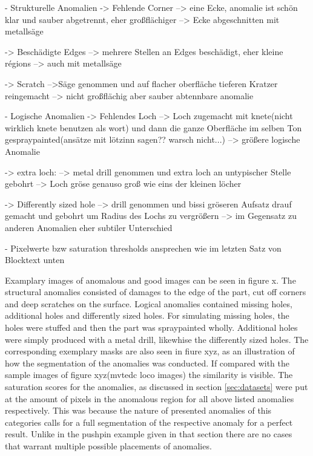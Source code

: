 - Strukturelle Anomalien
-> Fehlende Corner
--> eine Ecke, anomalie ist schön klar und sauber abgetrennt, eher großflächiger
--> Ecke abgeschnitten mit metallsäge

-> Beschädigte Edges 
--> mehrere Stellen an Edges beschädigt, eher kleine régions
--> auch mit metallsäge 

-> Scratch
-->Säge genommen und auf flacher oberfläche tieferen Kratzer reingemacht
--> nicht großflächig aber sauber abtennbare anomalie


- Logische Anomalien
-> Fehlendes Loch
--> Loch zugemacht mit knete(nicht wirklich knete benutzen als wort) und dann die ganze Oberfläche im selben Ton gespraypainted(ansätze mit lötzinn sagen?? warsch nicht...)
--> größere logische Anomalie

-> extra loch:
--> metal drill genommen und extra loch an untypischer Stelle gebohrt
--> Loch gröse genauso groß wie eins der kleinen löcher

-> Differently sized hole 
--> drill genommen und bissi gröseren Aufsatz drauf gemacht und gebohrt um Radius des Lochs zu vergrößern
--> im Gegensatz zu anderen Anomalien eher subtiler Unterschied

- Pixelwerte bzw saturation thresholds ansprechen wie im letzten Satz von Blocktext unten


Examplary images of anomalous and good images can be seen in figure x. The structural anomalies consisted of damages to the edge of the part, cut off corners and deep scratches on the surface. 
Logical anomalies contained missing holes, additional holes and differently sized holes. For simulating missing holes, the holes were stuffed and then the part was spraypainted wholly. 
Additional holes were simply produced with a metal drill, likewhise the differently sized holes. 
The corresponding exemplary masks are also seen in fiure xyz, as an illustration of how the segmentation of the anomalies was conducted. If compared with the sample images of figure xyz(mvtedc loco images) 
the similarity is visible. The saturation scores for the anomalies, as discussed in section \ref{sec:datasets} were put at the amount of pixels in the anomalous region for all above listed anomalies respectively.
This was because the nature of presented anomalies of this categories calls for a full segmentation of the respective anomaly for a perfect result. Unlike in the pushpin example given in that section 
there are no cases that warrant multiple possible placements of anomalies.









